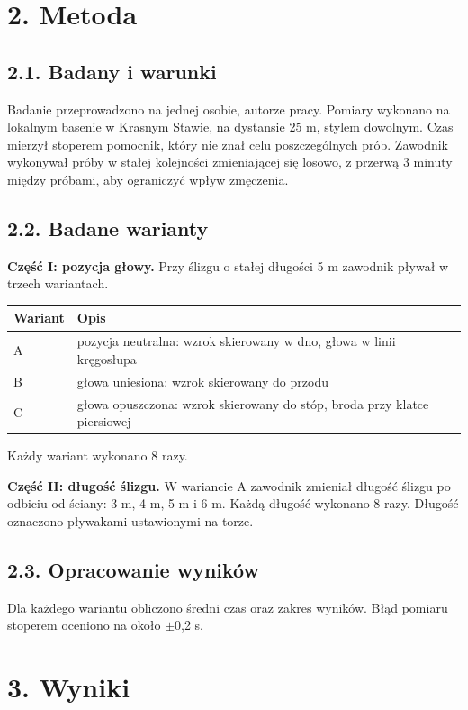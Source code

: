 \section*{2. Metoda}
\subsection*{2.1. Badany i warunki}
Badanie przeprowadzono na jednej osobie, autorze pracy. Pomiary wykonano na lokalnym basenie w Krasnym Stawie, na dystansie 25 m, stylem dowolnym. Czas mierzył stoperem pomocnik, który nie znał celu poszczególnych prób. Zawodnik wykonywał próby w stałej kolejności zmieniającej się losowo, z przerwą 3 minuty między próbami, aby ograniczyć wpływ zmęczenia.

\subsection*{2.2. Badane warianty}
\textbf{Część I: pozycja głowy.} Przy ślizgu o stałej długości 5 m zawodnik pływał w trzech wariantach.

\begin{tabularx}{\textwidth}{@{}lX@{}}
\toprule
\textbf{Wariant} & \textbf{Opis} \\
\midrule
A & pozycja neutralna: wzrok skierowany w dno, głowa w linii kręgosłupa \\
B & głowa uniesiona: wzrok skierowany do przodu \\
C & głowa opuszczona: wzrok skierowany do stóp, broda przy klatce piersiowej \\
\bottomrule
\end{tabularx}

\vspace{0.3cm}
Każdy wariant wykonano 8 razy.

\textbf{Część II: długość ślizgu.} W wariancie A zawodnik zmieniał długość ślizgu po odbiciu od ściany: 3 m, 4 m, 5 m i 6 m. Każdą długość wykonano 8 razy. Długość oznaczono pływakami ustawionymi na torze.

\subsection*{2.3. Opracowanie wyników}
Dla każdego wariantu obliczono średni czas oraz zakres wyników. Błąd pomiaru stoperem oceniono na około $\pm$0,2 s.

\section*{3. Wyniki}
